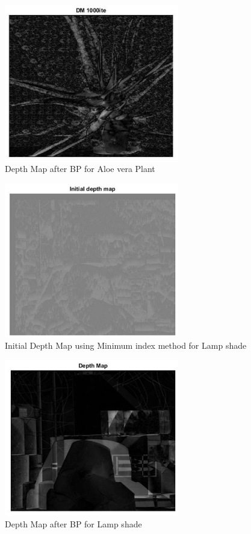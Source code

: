 \begin{figure}[h]
\begin{center}
\includegraphics[width=3in]{dmMIal.eps}
\caption{Depth Map after BP for Aloe vera Plant} \label{lined}
\end{center}
\end{figure}
\begin{figure}[h]
\begin{center}
\includegraphics[width=3in]{idmMIlam.eps}
\caption{Initial Depth Map using Minimum index method for Lamp shade} \label{lined}
\end{center}
\end{figure}
\begin{figure}[h]
\begin{center}
\includegraphics[width=3in]{dmMIlam.eps}
\caption{Depth Map after BP for Lamp shade} \label{lined}
\end{center}
\end{figure} 

